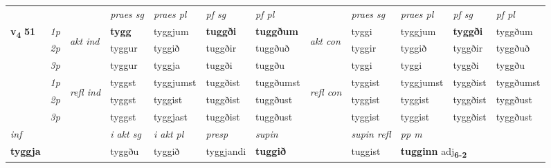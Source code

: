 \begin{longtable}[l]{X>{\footnotesize\itshape}llXXXXlXXXX}
 & &   & \textit{praes sg}  & \textit{praes pl}    & \textit{ pf sg} & \textit{pf pl} & & \textit{praes sg}  & \textit{praes pl}    & \textit{pf sg} & \textit{pf pl }  \\ \cmidrule{4-7} \cmidrule{9-12}
 \multirow{2}{*}{{{\textbf{v{\textsubscript{4}}} \Large{\textbf{51}}}}}  & 1p & \multirow{3}{*}{\begin{turn}{90}\textit{akt ind}\end{turn}} & \textbf{tygg} & tyggjum & \textbf{tuggði} & \textbf{tuggðum} & \multirow{3}{*}{\begin{turn}{90}\textit{akt con}\end{turn}} &tyggi & tyggjum & \textbf{tyggði} & tyggðum\\*
 & 2p &  &  tyggur  & tyggið & tuggðir & tuggðuð & & tyggir & tyggið & tyggðir & tyggðuð \\*
 & 3p &  & tyggur & tyggja & tuggði & tuggðu & & tyggi & tyggi& tyggði & tyggðu \\*
\cmidrule{4-7} \cmidrule{9-12}
 & 1p & \multirow{3}{*}{\begin{turn}{90}\textit{refl ind}\end{turn}}  & tyggst & tyggjumst & tuggðist & tuggðumst & \multirow{3}{*}{\begin{turn}{90}\textit{refl con}\end{turn}}  &tyggist & tyggjumst & tyggðist & tyggðumst \\*
 & 2p &  & tyggst & tyggist & tuggðist & tuggðust & &tyggist & tyggist & tyggðist & tyggðust \\*
 & 3p  & & tyggst & tyggjast & tuggðist & tuggðust & & tyggist & tyggist& tyggðist & tyggðust \\*
\cmidrule{4-7} \cmidrule{9-12}

   {\textit{inf}} & &  & \textit{i akt sg} & \textit{i akt pl}   & \textit{presp} & \textit{supin} && \textit{supin refl} & \textit{pp m} \\*
  {\textbf{tyggja}} & && tyggðu  & tyggið   & tyggjandi &  \textbf{tuggið} && tuggist & \multicolumn{2}{l}{\textbf{tugginn} adj\textbf{\textsubscript{6-2}}} \\*

\midrule


\end{longtable}
